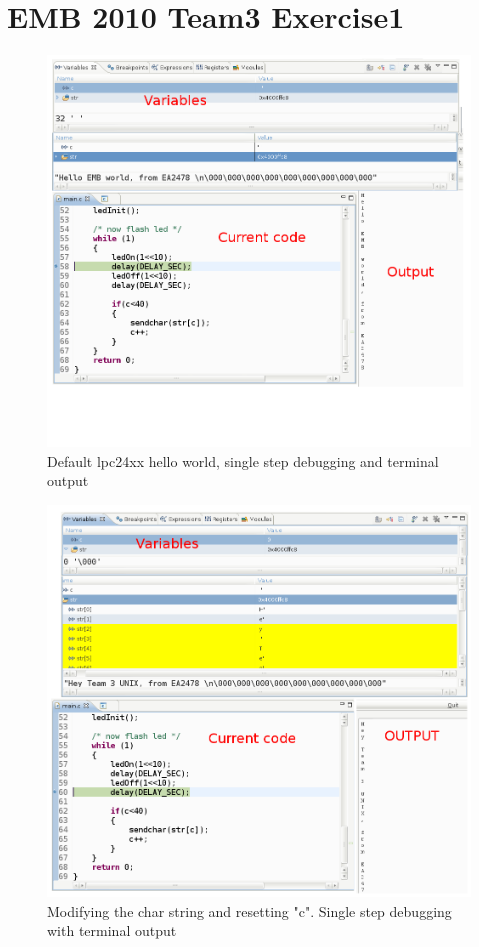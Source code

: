 

\part*{EMB 2010 Team3 Exercise1}
\begin{figure}[h!]		%
 \begin{centering}
  \includegraphics[width=1\textwidth]{screen_1.png}
   \caption{Default lpc24xx hello world, single step debugging and terminal output}
 \end{centering}
\end{figure}

\begin{figure}[h!]		%
 \begin{centering}
  \includegraphics[width=1\textwidth]{screen_2.png}
   \caption{Modifying the char string and resetting "c". Single step debugging with terminal output}
 \end{centering}
\end{figure}


